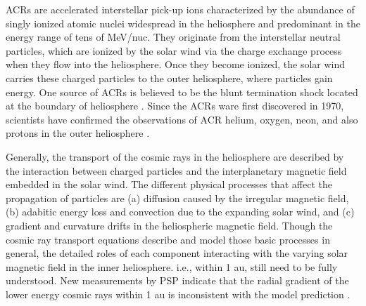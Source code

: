 \acp{ACR} are accelerated interstellar pick-up ions characterized by the abundance of singly ionized atomic nuclei widespread in the heliosphere and predominant in the energy range of tens of MeV/nuc. They originate from the interstellar neutral particles, which are ionized by the solar wind via the charge exchange process when they flow into the heliosphere. Once they become ionized, the solar wind carries these charged particles to the outer heliosphere, where particles gain energy.
One source of \acp{ACR} is believed to be the blunt termination shock located at the boundary of heliosphere \citep{McComas2006GeoRL}. Since the \acp{ACR} ware first discovered in 1970, scientists have confirmed the observations of \ac{ACR} helium, oxygen, neon, and also protons in the outer heliosphere \citep{Garcia1973ICRC,Hoverstadt1973PhRvL,McDonald1974ApJ,Potgieter2013LRSP}.

Generally, the transport of the cosmic rays in the heliosphere are described by the interaction between charged particles and the interplanetary magnetic field embedded in the solar wind. The different physical processes that affect the propagation of particles are (a) diffusion caused by the irregular magnetic field, (b) adabitic energy loss and convection due to the expanding solar wind, and (c) gradient and curvature drifts in the heliospheric magnetic field.
Though the cosmic ray transport equations describe and model those basic processes \citep{Parker1965Pss,Jokipii1977ApJ,Jokipii1981ApJ,McDonald2001ICRC} in general, the detailed roles of each component interacting with the varying solar magnetic field in the inner heliosphere. i.e., within 1 au, still need to be fully understood. New measurements by \ac{PSP} indicate that the radial gradient of the lower energy cosmic rays within 1 au is inconsistent with the model prediction \citep{Rankin2021ApJ}.

